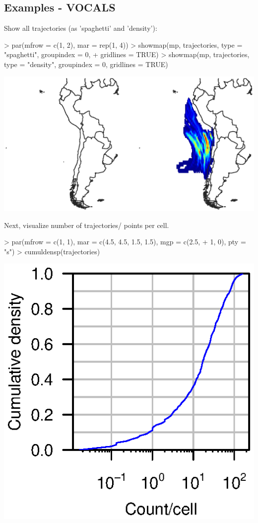 \documentclass{article}
\renewenvironment{Schunk}{\vspace{\topsep}}{\vspace{\topsep}}
\begin{document}
\subsection{Examples - VOCALS}
Show all trajectories (as 'spaghetti' and 'density'):

\begin{Schunk}
\begin{Sinput}
> par(mfrow = c(1, 2), mar = rep(1, 4))
> showmap(mp, trajectories, type = "spaghetti", groupindex = 0, 
+     gridlines = TRUE)
> showmap(mp, trajectories, type = "density", groupindex = 0, gridlines = TRUE)
\end{Sinput}
\end{Schunk}
\includegraphics{figures/fig-016}

Next, visualize number of trajectories/ points per cell.

\begin{Schunk}
\begin{Sinput}
> par(mfrow = c(1, 1), mar = c(4.5, 4.5, 1.5, 1.5), mgp = c(2.5, 
+     1, 0), pty = "s")
> cumuldensp(trajectories)
\end{Sinput}
\end{Schunk}
\includegraphics{figures/fig-017}
\end{document}

